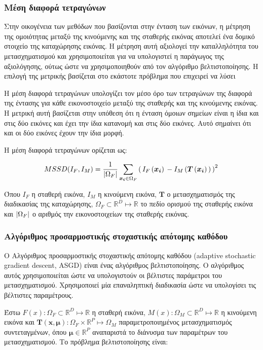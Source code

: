 \documentclass[a4paper,12pt]{article}
\DeclarePairedDelimiter\abs{\lvert}{\rvert}
\newcommand{\R}{\mathbb{R}}
\begin{document}
\subsubsection{Μέση διαφορά τετραγώνων} \label{MSSD}

Στην οικογένεια των μεθόδων που βασίζονται στην ένταση των εικόνων, η μέτρηση
της ομοιότητας μεταξύ της κινούμενης και της σταθερής εικόνας αποτελεί ένα
δομικό στοιχείο της καταχώρησης εικόνας. Η μέτρηση αυτή αξιολογεί την
καταλληλότητα του μετασχηματισμού και χρησιμοποιείται για να υπολογιστεί η
παράγωγος της αξιολόγησης, ούτως ώστε να χρησιμοποιηθούν από τον αλγόριθμο
βελτιστοποίησης. Η επιλογή της μετρικής βασίζεται στο εκάστοτε πρόβλημα που
επιχειρεί να λύσει

Η μέση διαφορά τετραγώνων υπολογίζει τον μέσο όρο των τετραγώνων της διαφορά της
έντασης για κάθε εικονοστοιχείο μεταξύ της σταθερής και της κινούμενης εικόνας.
Η μετρική αυτή βασίζεται στην υπόθεση ότι η ένταση όμοιων σημείων είναι η ίδια
και στις δύο εικόνες και έχει την ίδια κατανομή και στις δύο εικόνες. Αυτό
σημαίνει ότι και οι δύο εικόνες έχουν την ίδια μορφή. 

Η μέση διαφορά τετραγώνων ορίζεται ως:

\begin{equation*}
    MSSD(I_F, I_M) = \frac {1} {\abs{\Omega_F}} \sum_{\bm{x_i} \in \Omega_F} 
        \left(\, {I_F\left(\bm{x_i}\right)\, - 
                  I_M\left(\bm{T}\left(\bm{x_i}\right)\,\right)\,}
        \right)^2\, 
\end{equation*}

Όπου $I_F$ η σταθερή εικόνα, $I_M$ η κινούμενη εικόνα, $\bm{T}$ ο
μετασχηματισμός της διαδικασίας της καταχώρησης, $\Omega_F \subset \R^D \mapsto
\R$ το πεδίο ορισμού της σταθερής εικόνα και $\abs{\Omega_F}$ ο αριθμός την
εικονοστοιχείων της σταθερής εικόνας.


\subsubsection{Αλγόριθμος προσαρμοστικής στοχαστικής απότομης καθόδου}

Ο Αλγόριθμος προσαρμοστικής στοχαστικής απότομης καθόδου (adaptive stochastic
gradient descent, ASGD) \cite{ASGD:1} είναι ένας αλγόριθμος βελτιστοποίησης. Ο
αλγόριθμος αυτός χρησιμοποιείται ώστε να υπολογιστούν οι βέλτιστες παράμετροι
του μετασχηματισμού. Χρησιμοποιεί μία επαναληπτική διαδικασία ώστε να υπολογίσει
τις βέλτιστες παραμέτρους.

Έστω $F(x): \Omega_F \subset \R^D \mapsto \R$ η σταθερή εικόνα, $M(x): \Omega_M
\subset \R^D \mapsto \R$ η κινούμενη εικόνα και $\bm{T(x,\mu)}: \Omega_F \times
\R^P \mapsto \Omega_M$ παραμετροποιημένος μετασχηματισμός συντεταγμένων, όπου
$\bm{\mu} \in \R^P$ αναπαριστά το διάνυσμα των παραμέτρων του μετασχηματισμού.
Το πρόβλημα βελτιστοποίησης είναι:
\end{document}
